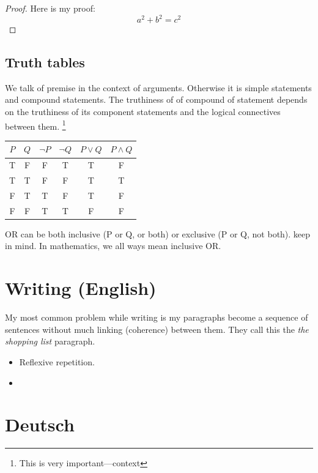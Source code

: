 \documentclass[a4paper]{article}
\begin{document}
\begin{proof}
    Here is my proof:
    \[
        a^2 + b^2 = c^2
    \]
\end{proof}

\subsection*{Truth tables}
We talk of premise in the context of arguments. Otherwise it is simple statements and compound statements. The truthiness of of compound of statement depends on 
the truthiness of its component statements and the logical connectives between them. \footnote{This is very important---context}

\begin{tabular}{ c c c c c c}
    \(P\) & \(Q\) & \(\lnot P\) & \(\lnot Q\) & \(P \lor Q\) & \(P \land Q\) \\
    \hline 
    T     & F     & F           & T           & T            & F             \\
    T     & T     & F           & F           & T            & T             \\
    F     & T     & T           & F           & T            & F             \\
    F     & F     & T           & T           & F            & F             \\
    \hline  
\end{tabular}

OR can be both inclusive (P or Q, or both) or exclusive (P or Q, not both). keep in mind. In mathematics, we all ways
mean inclusive OR.

\lstset{style=custom-java}

\section*{Writing (English)}
My most common problem while writing is my paragraphs become a sequence of sentences without much linking (coherence)
between them. They call this the \emph{the shopping list} paragraph.

\begin{itemize}
    \item Reflexive repetition.
    \item 
\end{itemize}

\section*{Deutsch}
\end{document}

